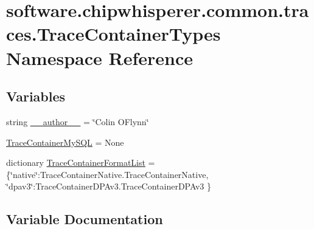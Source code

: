 \hypertarget{namespacesoftware_1_1chipwhisperer_1_1common_1_1traces_1_1TraceContainerTypes}{}\section{software.\+chipwhisperer.\+common.\+traces.\+Trace\+Container\+Types Namespace Reference}
\label{namespacesoftware_1_1chipwhisperer_1_1common_1_1traces_1_1TraceContainerTypes}
\subsection*{Variables}
\begin{DoxyCompactItemize}
\item 
string \hyperlink{namespacesoftware_1_1chipwhisperer_1_1common_1_1traces_1_1TraceContainerTypes_ac6eecf4c3deaf44015ccb8644a722e72}{\+\_\+\+\_\+author\+\_\+\+\_\+} = \char`\"{}Colin O\textquotesingle{}Flynn\char`\"{}
\item 
\hyperlink{namespacesoftware_1_1chipwhisperer_1_1common_1_1traces_1_1TraceContainerTypes_a5ccdf562e9a1170ae11724df37258848}{Trace\+Container\+My\+S\+Q\+L} = None
\item 
dictionary \hyperlink{namespacesoftware_1_1chipwhisperer_1_1common_1_1traces_1_1TraceContainerTypes_a41a0db71001b2c37376e4d7cf1aa3a77}{Trace\+Container\+Format\+List} = \{\char`\"{}native\char`\"{}\+:Trace\+Container\+Native.\+Trace\+Container\+Native, \char`\"{}dpav3\char`\"{}\+:Trace\+Container\+D\+P\+Av3.\+Trace\+Container\+D\+P\+Av3 \}
\end{DoxyCompactItemize}


\subsection{Variable Documentation}
\hypertarget{namespacesoftware_1_1chipwhisperer_1_1common_1_1traces_1_1TraceContainerTypes_ac6eecf4c3deaf44015ccb8644a722e72}{}
